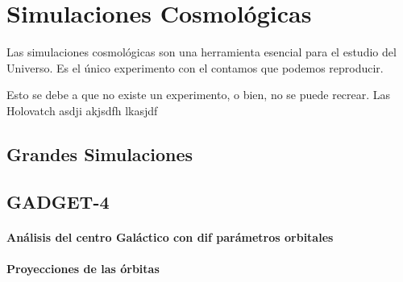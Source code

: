 
\chapter{Simulaciones Cosmológicas}
\label{chap:2 Sim}
\setcounter{equation}{0}
Las simulaciones cosmológicas son una herramienta esencial para el estudio del Universo. Es el único experimento con el contamos que podemos reproducir.

Esto se debe a que no existe un experimento, o bien, no se puede recrear. Las
Holovatch asdji akjsdfh lkasjdf

\section{Grandes Simulaciones}


\section{GADGET-4}



\subsubsection{Análisis del centro Galáctico con dif parámetros orbitales}




\subsubsection{Proyecciones de las órbitas}
